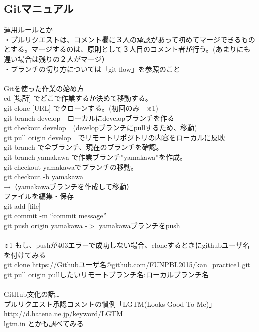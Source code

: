 \documentclass[openany,11pt,papersize]{jsbook}
\begin{document}
\begin{appendix}
\section{Gitマニュアル}
運用ルールとか \\
・プルリクエストは、コメント欄に３人の承認があって初めてマージできるものとする。マージするのは、原則として３人目のコメント者が行う。(あまりにも遅い場合は残りの２人がマージ）\\
・ブランチの切り方については「git-flow」を参照のこと \\ \\
Gitを使った作業の始め方 \\
cd [場所] でどこで作業するか決めて移動する。 \\
git clone [URL] でクローンする。(初回のみ　※1) \\
git branch develop　ローカルにdevelopブランチを作る \\
git checkout develop　(developブランチにpullするため、移動) \\
git pull origin develop　でリモートリポジトリの内容をローカルに反映 \\
git branch で全ブランチ、現在のブランチを確認。 \\
git branch yamakawa で作業ブランチ”yamakawa”を作成。 \\
git checkout yamakawaでブランチの移動。 \\
	git checkout -b yamakawa \\
→（yamakawaブランチを作成して移動）\\
 ファイルを編集・保存 \\
git add [file] \\
git commit -m “commit message” \\
git push origin yamakawa  -$>$  yamakawaブランチをpush \\ \\
※1
もし、pushが403エラーで成功しない場合、cloneするときにgithubユーザ名を付けてみる \\
git clone https://Githubユーザ名@github.com/FUNPBL2015/kan\_practice1.git \\
git pull origin pullしたいリモートブランチ名:ローカルブランチ名 \\ \\
GitHub文化の話… \\
プルリクエスト承認コメントの慣例「LGTM(Looks Good To Me)」 \\
http://d.hatena.ne.jp/keyword/LGTM \\
lgtm.in とかも調べてみる \\ \\

\end{appendix}
\end{document}
